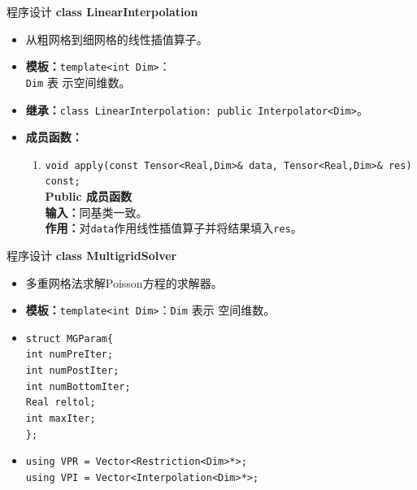 \documentclass{beamer}
\begin{document}
\begin{frame}{程序设计}
  \textbf{class LinearInterpolation}
  \begin{itemize}
    \item 从粗网格到细网格的线性插值算子。
    \item \textbf{模板：}\texttt{template<int Dim>}：\\\texttt{Dim} 表
      示空间维数。
      \item \textbf{继承：}\texttt{class LinearInterpolation: public Interpolator<Dim>}。
    \item \textbf{成员函数：}
            \begin{enumerate}[(1)]
                                \item \texttt{void apply(const Tensor<Real,Dim>\& data,
                    Tensor<Real,Dim>\& res) const;}\\
                  \textbf{Public 成员函数}\\
                \textbf{输入：}同基类一致。\\
                \textbf{作用：}对\texttt{data}作用线性插值算子并将结果填入\texttt{res}。
            \end{enumerate}
          \end{itemize}
\end{frame}

\begin{frame}{程序设计}
  \textbf{\large class MultigridSolver}
  \begin{itemize}
  \item 多重网格法求解Poisson方程的求解器。
  \item \textbf{模板：}\texttt{template<int Dim>}：\texttt{Dim} 表示
    空间维数。
  \item \texttt{struct MGParam\{\\
      int numPreIter;\\
      int numPostIter;\\
      int numBottomIter;\\
      Real reltol;\\
      int maxIter;\\
      \};}
    \item \texttt{using VPR = Vector<Restriction<Dim>*>;\\
        using VPI = Vector<Interpolation<Dim>*>;}
      
    \end{itemize}
  \end{frame}
\end{document}
